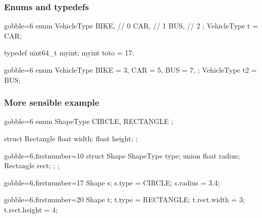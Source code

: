 \begin{frame}[fragile]
  \frametitle{Enums and typedefs}
  \begin{multicols}{2}
    \begin{cppcode*}{gobble=6}
      enum VehicleType {
        BIKE,  // 0
        CAR,   // 1
        BUS,   // 2
      };
      VehicleType t = CAR;
      
      typedef uint64_t myint;
      myint toto = 17;
    \end{cppcode*}
    \columnbreak
    \begin{cppcode*}{gobble=6}
      enum VehicleType {
        BIKE = 3,
        CAR = 5,
        BUS = 7,
      };
      VehicleType t2 = BUS;
    \end{cppcode*}
  \end{multicols}
\end{frame}


\begin{frame}[fragile]
  \frametitle{More sensible example}
  \begin{multicols}{2}
    \begin{cppcode*}{gobble=6}
      enum ShapeType {
        CIRCLE,
        RECTANGLE
      };
      
      struct Rectangle {
        float width;
        float height;
      };
    \end{cppcode*}
    \columnbreak
    \pause
    \begin{cppcode*}{gobble=6,firstnumber=10}
      struct Shape {
        ShapeType type;
        union { 
          float radius;
          Rectangle rect;
        };
      };
    \end{cppcode*}
  \end{multicols}
  \pause
  \begin{multicols}{2}
    \begin{cppcode*}{gobble=6,firstnumber=17}
      Shape s;
      s.type = CIRCLE;
      s.radius = 3.4;
      
    \end{cppcode*}
    \columnbreak
    \begin{cppcode*}{gobble=6,firstnumber=20}
      Shape t;
      t.type = RECTANGLE;
      t.rect.width = 3;
      t.rect.height = 4;
    \end{cppcode*}
  \end{multicols}
\end{frame}

